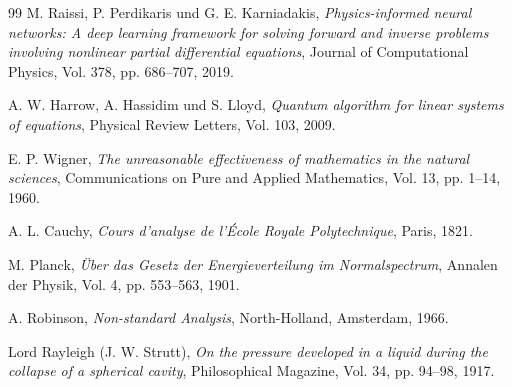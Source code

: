 ﻿\documentclass[12pt,a4paper]{article}
\theoremstyle{definition}
\theoremstyle{remark}
\begin{document}
\begin{thebibliography}{99}
M. Raissi, P. Perdikaris und G. E. Karniadakis, \textit{Physics-informed neural networks: A deep learning framework for solving forward and inverse problems involving nonlinear partial differential equations}, Journal of Computational Physics, Vol. 378, pp. 686--707, 2019.

A. W. Harrow, A. Hassidim und S. Lloyd, \textit{Quantum algorithm for linear systems of equations}, Physical Review Letters, Vol. 103, 2009.

E. P. Wigner, \textit{The unreasonable effectiveness of mathematics in the natural sciences}, Communications on Pure and Applied Mathematics, Vol. 13, pp. 1--14, 1960.

A. L. Cauchy, \textit{Cours d'analyse de l'École Royale Polytechnique}, Paris, 1821.

M. Planck, \textit{Über das Gesetz der Energieverteilung im Normalspectrum}, Annalen der Physik, Vol. 4, pp. 553--563, 1901.

A. Robinson, \textit{Non-standard Analysis}, North-Holland, Amsterdam, 1966.

Lord Rayleigh (J. W. Strutt), \textit{On the pressure developed in a liquid during the collapse of a spherical cavity}, Philosophical Magazine, Vol. 34, pp. 94--98, 1917.

\end{thebibliography}
\end{document}
